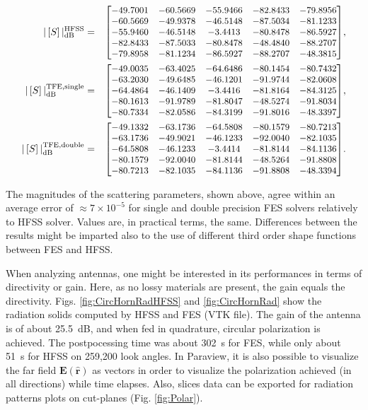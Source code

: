 \begin{eqnarray*}
|\left[S\right]|_\mathrm{dB}^\mathrm{HFSS} & = & \small{
\begin{bmatrix}
  -49.7001 & -60.5669 & -55.9466 & -82.8433 & -79.8956 \\
  -60.5669 & -49.9378 & -46.5148 & -87.5034 & -81.1233 \\
  -55.9460 & -46.5148 &  -3.4413 & -80.8478 & -86.5927 \\
  -82.8433 & -87.5033 & -80.8478 & -48.4840 & -88.2707 \\
  -79.8958 & -81.1234 & -86.5927 & -88.2707 & -48.3815
\end{bmatrix}},\\
|\left[S\right]|_\mathrm{dB}^\mathrm{TFE,single} & = & \small{
\begin{bmatrix}
  -49.0035 & -63.4025 & -64.6486 & -80.1454 & -80.7432 \\
  -63.2030 & -49.6485 & -46.1201 & -91.9744 & -82.0608 \\
  -64.4864 & -46.1409 &  -3.4416 & -81.8164 & -84.3125 \\
  -80.1613 & -91.9789 & -81.8047 & -48.5274 & -91.8034 \\
  -80.7334 & -82.0586 & -84.3199 & -91.8016 & -48.3397
\end{bmatrix}},\\
|\left[S\right]|_\mathrm{dB}^\mathrm{TFE,double} & = & \small{
\begin{bmatrix}
  -49.1332 & -63.1736 & -64.5808 & -80.1579 & -80.7213 \\
  -63.1736 & -49.9021 & -46.1233 & -92.0040 & -82.1035 \\
  -64.5808 & -46.1233 &  -3.4414 & -81.8144 & -84.1136 \\
  -80.1579 & -92.0040 & -81.8144 & -48.5264 & -91.8808 \\
  -80.7213 & -82.1035 & -84.1136 & -91.8808 & -48.3394 \\
\end{bmatrix}}.
\end{eqnarray*}

The magnitudes of the scattering parameters, shown above, agree within an average error of $\approx 7 \times 10^{-5}$ for single and double precision FES solvers relatively to HFSS solver. Values are, in practical terms, the same. Differences between the results might be imparted also to the use of different third order shape functions between FES and HFSS.

When analyzing antennas, one might be interested in its performances in terms of directivity or gain. Here, as no lossy materials are present, the gain equals the directivity. Figs. \ref{fig:CircHornRadHFSS} and \ref{fig:CircHornRad} show the radiation solids computed by HFSS and FES (VTK file). The gain of the antenna is of about 25.5~dB, and when fed in quadrature, circular polarization is achieved. The postpocessing time was about 302~s for FES, while only about 51~s for HFSS on 259,200 look angles. In Paraview, it is also possible to visualize the far field $\mathbf{E}(\hat{\mathbf{r}})$ as vectors in order to visualize the polarization achieved (in all directions) while time elapses. Also, slices data can be exported for radiation patterns plots on cut-planes (Fig. \ref{fig:Polar}).

